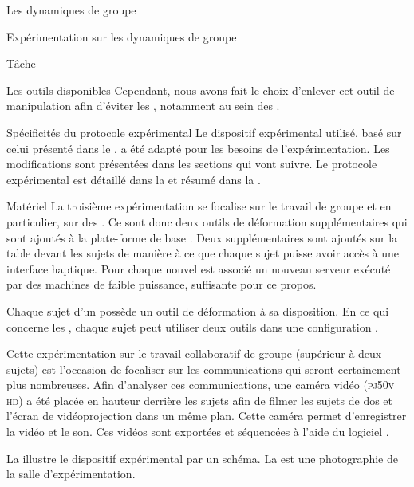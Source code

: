 \documentclass[myfrancais]{mythesis}
\begin{document}
\begin{mychapter}{Les dynamiques de groupe}
\begin{mysection}{Expérimentation sur les dynamiques de groupe}
\begin{mysubsection}{Tâche}
\begin{mysubsubsection}{Les outils disponibles}
					Cependant, nous avons fait le choix d'enlever cet outil de manipulation afin d'éviter les , notamment au sein des .
				\end{mysubsubsection}
			\end{mysubsection}
			\begin{mysubsection}{Spécificités du protocole expérimental}
				Le dispositif expérimental utilisé, basé sur celui présenté dans le , a été adapté pour les besoins de l'expérimentation.
				Les modifications sont présentées dans les sections qui vont suivre.
				Le protocole expérimental est détaillé dans la  et résumé dans la .
				\begin{mysubsubsection}[sss-exp3-Materiel]{Matériel}
					La troisième expérimentation se focalise sur le travail de groupe et en particulier, sur des .
					Ce sont donc deux outils de déformation supplémentaires qui sont ajoutés à la plate-forme de base .
					Deux \myOmni supplémentaires sont ajoutés sur la table devant les sujets de manière à ce que chaque sujet puisse avoir accès à une interface haptique.
					Pour chaque nouvel \myOmni est associé un nouveau serveur  exécuté par des machines de faible puissance, suffisante pour ce propos.

					Chaque sujet d'un  possède un outil de déformation à sa disposition.
					En ce qui concerne les , chaque sujet peut utiliser deux outils dans une configuration .

					Cette expérimentation sur le travail collaboratif de groupe (supérieur à deux sujets) est l'occasion de focaliser sur les communications qui seront certainement plus nombreuses.
					Afin d'analyser ces communications, une caméra vidéo \mySony (\textsc{pj50v hd}) a été placée en hauteur derrière les sujets afin de filmer les sujets de dos et l'écran de vidéoprojection dans un même plan.
					Cette caméra permet d'enregistrer la vidéo et le son.
					Ces vidéos sont exportées et séquencées \myafortiori à l'aide du logiciel \myiMovie.

					La  illustre le dispositif expérimental par un schéma.
					La  est une photographie de la salle d'expérimentation.


\end{mysubsubsection}
\end{mysubsection}
\end{mysection}
\end{mychapter}
\end{document}
